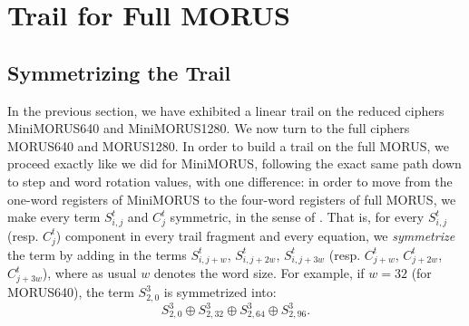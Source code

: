 \documentclass{llncs}
\newcommand{\cipher}[1]{\textsf{#1}}
\begin{document}
\section{Trail for Full \cipher{MORUS}}

\subsection{Symmetrizing the Trail}
In the previous section, we have exhibited a linear trail on the reduced ciphers \cipher{MiniMORUS640} and \cipher{MiniMORUS1280}. We now turn to the full ciphers \cipher{MORUS640} and \cipher{MORUS1280}.
In order to build a trail on the full \cipher{MORUS}, we proceed exactly like we did for \cipher{MiniMORUS}, following the exact same path down to step and word rotation values, with one difference: in order to move from the one-word registers of \cipher{MiniMORUS} to the four-word registers of full \cipher{MORUS}, we make every term $S^t_{i,j}$ and $C^t_j$ symmetric, in the sense of .
That is, for every $S^t_{i,j}$ (resp. $C^t_j$) component in every trail fragment and every equation, we \emph{symmetrize} the term by adding in the terms $S^t_{i,j+w}$, $S^t_{i,j+2w}$, $S^t_{i,j+3w}$ (resp. $C^t_{j+w}$, $C^t_{j+2w}$, $C^t_{j+3w}$), where as usual $w$ denotes the word size. For example, if $w=32$ (for \cipher{MORUS640}), the term $S^3_{2,0}$ is symmetrized into:
\[
S^3_{2,0} \oplus S^3_{2,32} \oplus S^3_{2,64} \oplus S^3_{2,96}.
\]
\end{document}
